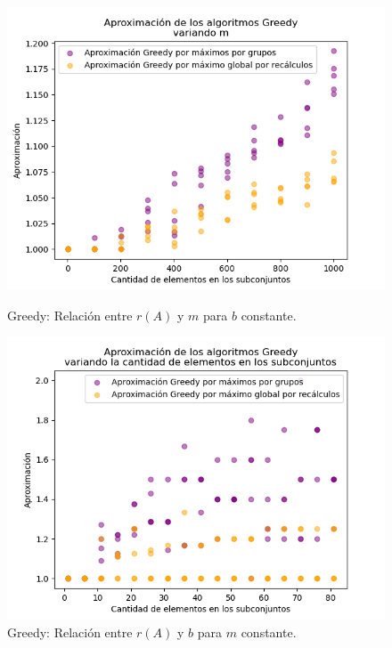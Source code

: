 \begin{figure}[h]
    \centering
    \begin{minipage}{0.45\textwidth}
        \centering
        \includegraphics[width=\textwidth]{img/medicion_r_greedy_var_m.png}
        \caption{Greedy: Relación entre $r(A)$ y $m$ para $b$ constante.}
        \label{fig:medicion_r_greedy_var_m}
    \end{minipage}\hfill
    \begin{minipage}{0.45\textwidth}
        \centering
        \includegraphics[width=\textwidth]{img/medicion_r_greedy_var_b.png}
        \caption{Greedy: Relación entre $r(A)$ y $b$ para $m$ constante.}
        \label{fig:medicion_r_greedy_var_b}
    \end{minipage}
\end{figure}


